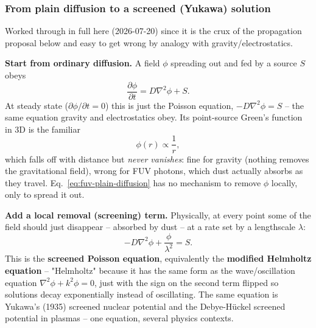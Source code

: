 \subsubsection{From plain diffusion to a screened (Yukawa) solution}
\label{sec:fuv-yukawa}

Worked through in full here (2026-07-20) since it is the crux of the
propagation proposal below and easy to get wrong by analogy with
gravity/electrostatics.

\textbf{Start from ordinary diffusion.} A field $\phi$ spreading out
and fed by a source $S$ obeys
\begin{equation}
  \frac{\partial\phi}{\partial t} = D\nabla^2\phi + S .
  \label{eq:fuv-plain-diffusion}
\end{equation}
At steady state ($\partial\phi/\partial t=0$) this is just the Poisson
equation, $-D\nabla^2\phi=S$ -- the same equation gravity and
electrostatics obey. Its point-source Green's function in 3D is the
familiar
\begin{equation}
  \phi(r) \propto \frac{1}{r},
  \label{eq:fuv-poisson-green}
\end{equation}
which falls off with distance but \emph{never vanishes}: fine for
gravity (nothing removes the gravitational field), wrong for FUV
photons, which dust actually absorbs as they travel. Eq.~\ref{eq:fuv-plain-diffusion}
has no mechanism to remove $\phi$ locally, only to spread it out.

\textbf{Add a local removal (screening) term.} Physically, at every
point some of the field should just disappear -- absorbed by dust --
at a rate set by a lengthscale $\lambda$:
\begin{equation}
  -D\nabla^2\phi + \frac{\phi}{\lambda^2} = S .
  \label{eq:fuv-screened-helmholtz}
\end{equation}
This is the \textbf{screened Poisson equation}, equivalently the
\textbf{modified Helmholtz equation} -- "Helmholtz" because it has the
same form as the wave/oscillation equation $\nabla^2\phi+k^2\phi=0$,
just with the sign on the second term flipped so solutions decay
exponentially instead of oscillating. The same equation is Yukawa's
(1935) screened nuclear potential and the Debye-H\"uckel screened
potential in plasmas -- one equation, several physics contexts.

